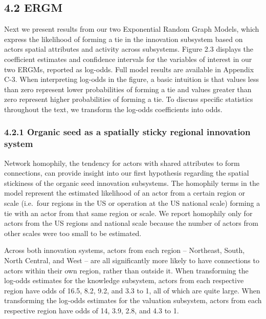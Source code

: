 \documentclass[twoside,12pt,final]{ucthesis-CA2012}
\begin{document}
\begin{ucmainmatter}
{\subsection{4.2 ERGM}\label{ergm}}

Next we present results from our two Exponential Random Graph Models,
which express the likelihood of forming a tie in the innovation
subsystem based on actors\textquotesingle{} spatial attributes and activity across
subsystems. Figure 2.3 displays the coefficient estimates and confidence
intervals for the variables of interest in our two ERGMs, reported as
log-odds. Full model results are available in Appendix C-3. When
interpreting log-odds in the figure, a basic intuition is that values
less than zero represent lower probabilities of forming a tie and values
greater than zero represent higher probabilities of forming a tie. To
discuss specific statistics throughout the text, we transform the
log-odds coefficients into odds.

\hypertarget{organic-seed-as-a-spatially-sticky-regional-innovation-system}{%
\subsubsection{4.2.1 Organic seed as a spatially sticky regional innovation system}\label{organic-seed-as-a-spatially-sticky-regional-innovation-system}}

Network \textquotesingle homophily\textquotesingle, the tendency for actors with shared attributes to
form connections, can provide insight into our first hypothesis
regarding the spatial stickiness of the organic seed innovation
subsystems. The homophily terms in the model represent the estimated
likelihood of an actor from a certain region or scale (i.e.~four regions
in the US or operation at the US national scale) forming a tie with an
actor from that same region or scale. We report homophily only for
actors from the US regions and national scale because the number of
actors from other scales were too small to be estimated.

Across both innovation systems, actors from each region -- Northeast,
South, North Central, and West -- are all significantly more likely to
have connections to actors within their own region, rather than outside
it. When transforming the log-odds estimates for the knowledge
subsystem, actors from each respective region have odds of 16.5, 8.2,
9.2, and 3.3 to 1, all of which are quite large. When transforming the
log-odds estimates for the valuation subsystem, actors from each
respective region have odds of 14, 3.9, 2.8, and 4.3 to 1.


\end{ucmainmatter}
\end{document}

